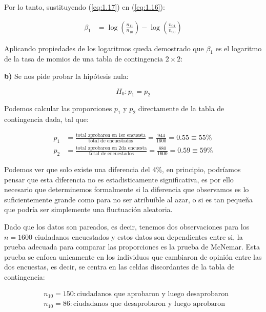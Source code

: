 Por lo tanto, sustituyendo (\ref{eq:1.17}) en (\ref{eq:1.16}):

\begin{align*}
    \beta_1 &= \log\left(\frac{n_{11} }{n_{10}}\right) - \log\left(\frac{n_{01}}{n_{00}}\right)
\end{align*}

Aplicando propiedades de los logaritmos queda demostrado que $\beta_1$ es el logaritmo de la tasa de momios de una tabla de contingencia $2\times 2$:

\begin{center}
\end{center}

\textbf{b)} Se nos pide probar la hipótesis nula:

\begin{equation}
    H_0:p_1=p_2
    \label{eq:1.18}
\end{equation}

Podemos calcular las proporciones $p_1$ y $p_2$ directamente de la tabla de contingencia dada, tal que:

\begin{align*}
    p_1 &= \frac{\text{total aprobaron en 1er encuesta}}{\text{total de encuestados}} = \frac{944}{1600} = 0.55 \equiv 55\% \\[0.1cm]
    p_2 &= \frac{\text{total aprobaron en 2da encuesta}}{\text{total de encuestados}} = \frac{880}{1600} = 0.59 \equiv 59\% 
\end{align*}

Podemos ver que solo existe una diferencia del 4\%, en principio, podríamos pensar que esta diferencia no es estadisticamente significativa, es por ello necesario que determinemos formalmente si la diferencia que observamos es lo suficientemente grande como para no ser atribuible al azar, o si es tan pequeña que podría ser simplemente una fluctuación aleatoria.

Dado que los datos son pareados, es decir, tenemos dos observaciones para los $n=1600$ ciudadanos encuestados y estos datos son dependientes entre si, la prueba adecuada para comparar las proporciones es la prueba de McNemar. Esta prueba se enfoca unicamente en los individuos que cambiaron de opinión entre las dos encuestas, es decir, se centra en las celdas discordantes de la tabla de contingencia: 

\begin{align*}
    &n_{10}=150: \text{ciudadanos que aprobaron y luego desaprobaron} \\[0.1cm]
    &n_{10}=86: \text{ciudadanos que desaprobaron y luego aprobaron} 
\end{align*}

